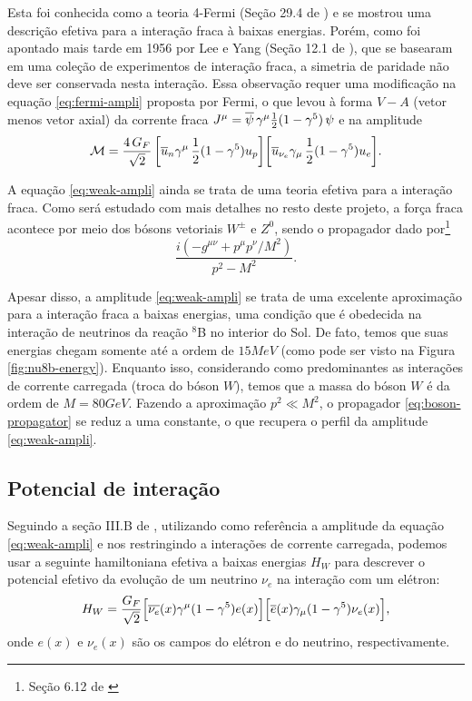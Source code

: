 \documentclass[12pt]{report}
\begin{document}
Esta foi conhecida como a teoria 4-Fermi (Seção 29.4 de \cite{schwartz}) e se mostrou uma descrição efetiva para a interação fraca à baixas energias. Porém, como foi apontado mais tarde em 1956 por Lee e Yang (Seção 12.1 de \cite{halzen}), que se basearam em uma coleção de experimentos de interação fraca, a simetria de paridade não deve ser conservada nesta interação. Essa observação requer uma modificação na equação \ref{eq:fermi-ampli} proposta por Fermi, o que levou à forma $V-A$ (vetor menos vetor axial) da corrente fraca $J^\mu = \overline{\psi} \, \gamma^\mu \frac{1}{2} (1 - \gamma^5) \, \psi$ e na amplitude
\begin{equation} \label{eq:weak-ampli}
\mathcal{M} = \frac{4 \, G_F}{\sqrt{2}} \,
\qty[ \overline{u}_n \gamma^\mu \, \frac{1}{2} (1 - \gamma^5) u_p ]
\qty[ \overline{u}_{\nu_e} \gamma_\mu \, \frac{1}{2} (1 - \gamma^5) u_e ] .
\end{equation}

A equação \ref{eq:weak-ampli} ainda se trata de uma teoria efetiva para a interação fraca. Como será estudado com mais detalhes no resto deste projeto, a força fraca acontece por meio dos bósons vetoriais $W^{\pm}$ e $Z^0$, sendo o propagador dado por\footnote{Seção 6.12 de \cite{halzen}}
\begin{equation} \label{eq:boson-propagator}
\frac{i (- g^{\mu \nu} + p^{\mu} p^{\nu} / M^2)}{p^2 - M^2}.
\end{equation}

Apesar disso, a amplitude \ref{eq:weak-ampli} se trata de uma excelente aproximação para a interação fraca a baixas energias, uma condição que é obedecida na interação de neutrinos da reação $^8$B no interior do Sol. De fato, temos que suas energias chegam somente até a ordem de $15 \unit{MeV}$ (como pode ser visto na Figura \ref{fig:nu8b-energy}). Enquanto isso, considerando como predominantes as interações de corrente carregada (troca do bóson $W$), temos que a massa do bóson $W$ é da ordem de $M = 80 \unit{GeV}$. Fazendo a aproximação $p^2 \ll M^2$, o propagador \ref{eq:boson-propagator} se reduz a uma constante, o que recupera o perfil da amplitude \ref{eq:weak-ampli}.


\subsection{Potencial de interação} \label{sec:potencial-int}

Seguindo a seção III.B de \cite{gonzalez}, utilizando como referência a amplitude da equação \ref{eq:weak-ampli} e nos restringindo a interações de corrente carregada, podemos usar a seguinte hamiltoniana efetiva a baixas energias $H_W$ para descrever o potencial efetivo da evolução de um neutrino $\nu_e$ na interação com um elétron:
$$
H_W = \frac{G_F}{\sqrt{2}}
\Big[ \overline{\nu_e}(x) \gamma^\mu (1 - \gamma^5) e(x)\Big]
\Big[ \overline{e}(x) \gamma_\mu (1 - \gamma^5) \nu_e(x)\Big],
$$
onde $e(x)$ e $\nu_e(x)$ são os campos do elétron e do neutrino, respectivamente.
\end{document}
